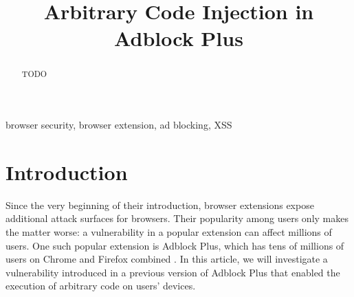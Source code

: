 \documentclass[conference]{IEEEtran}
\begin{document}
\title{Arbitrary Code Injection in Adblock Plus
}

\author{
\and
{}
\and
{}
}

\maketitle

\begin{abstract}
TODO
\end{abstract}

\begin{IEEEkeywords}
browser security, browser extension, ad blocking, XSS
\end{IEEEkeywords}

\section{Introduction}
Since the very beginning of their introduction, browser extensions expose additional attack surfaces for browsers. Their popularity among users only makes the matter worse: a vulnerability in a popular extension can affect millions of users. One such popular extension is Adblock Plus, which has tens of millions of users on Chrome and Firefox combined \cite{noauthor_adblockchrome_nodate, noauthor_adblockfirefox_nodate}. In this article, we will investigate a vulnerability introduced in a previous version of Adblock Plus that enabled the execution of arbitrary code on users' devices.
\end{document}

